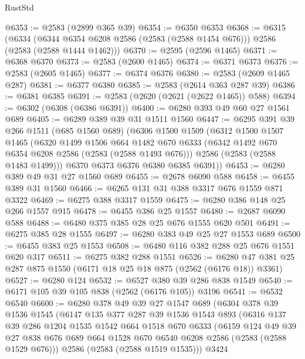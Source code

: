 \begin{lexlean}{RustStd}
\begin{coremodule}
@6353 := @2583 (@2899 @365 @39)
@6354 := @6350 @6353
@6368 := @6315
    (@6334 (@6344 @6354 @6208 @2586 (@2583 (@2588 @1454 @676))) @2586 (@2583 (@2588 @1444 @1462)))
@6370 := @2595 (@2596 @1465)
@6371 := @6368 @6370
@6373 := @2583 (@2600 @1465)
@6374 := @6371 @6373
@6376 := @2583 (@2605 @1465)
@6377 := @6374 @6376
@6380 := @2583 (@2609 @1465 @287)
@6381 := @6377 @6380
@6385 := @2583 (@2614 @363 @287 @39)
@6386 := @6381 @6385
@6391 := @2583 (@2620 (@2621 (@2622 @1465)) @588)
@6394 := @6302 (@6308 (@6386 @6391))
@6400 := @6280 @393 @49 @60 @27 @1561 @689
@6405 := @6289 @389 @39 @31 @1511 @1560
@6447 := @6295
    @391
    @39
    @266
    @1511
    (@685 @1560 @689)
    (@6306
      @1500
      @1509
      (@6312
        @1500
        @1507
        @1465
        (@6320
          @1499
          @1506
          @664
          @1482
          @670
          @6333
          (@6342 @1492 @670 @6354 @6208 @2586 (@2583 (@2588 @1493 @676)))
          @2586
          (@2583 (@2588 @1483 @1499)))
        @6370
        @6373
        @6376
        @6380
        @6385
        @6391))
@6453 := @6280 @389 @49 @31 @27 @1560 @689
@6455 := @2678 @6090 @588
@6458 := @6455 @389 @31 @1560
@6466 := @6265 @131 @31 @388 @3317 @676 @1559 @871 @3322
@6469 := @6275 @388 @3317 @1559
@6475 := @6280 @386 @148 @25 @266 @1557 @915
@6478 := @6455 @386 @25 @1557
@6480 := @2687 @6090 @588
@6488 := @6480 @375 @385 @28 @25 @676 @1555 @620 @501
@6491 := @6275 @385 @28 @1555
@6497 := @6280 @383 @49 @25 @27 @1553 @689
@6500 := @6455 @383 @25 @1553
@6508 := @6480 @116 @382 @288 @25 @676 @1551 @620 @317
@6511 := @6275 @382 @288 @1551
@6526 := @6280 @47 @381 @25 @287 @875 @1550 (@6171 @18 @25 @18 @875 (@2562 (@6176 @18)) @3361)
@6527 := @6280 @124
@6532 := @6527 @380 @39 @286 @838 @1549
@6540 := @6171 @105 @39 @105 @838 (@2562 (@6176 @105)) @3196
@6541 := @6532 @6540
@6600 := @6280
    @378
    @49
    @39
    @27
    @1547
    @689
    (@6304
      @378
      @39
      @1536
      @1545
      (@6147
        @135
        @377
        @287
        @39
        @1536
        @1543
        @893
        (@6316
          @137
          @39
          @286
          @1204
          @1535
          @1542
          @664
          @1518
          @670
          @6333
          (@6159
            @124
            @49
            @39
            @27
            @838
            @676
            @689
            @664
            @1528
            @670
            @6540
            @6208
            @2586
            (@2583 (@2588 @1529 @676)))
          @2586
          (@2583 (@2588 @1519 @1535)))
        @3424

\end{coremodule}
\end{lexlean}
